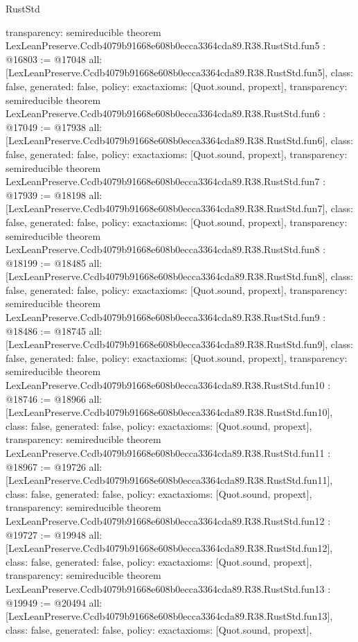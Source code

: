 \begin{lexlean}{RustStd}
\begin{coremodule}
{  transparency: semireducible
}
theorem LexLeanPreserve.Ccdb4079b91668e608b0ecca3364cda89.R38.RustStd.fun5 : @16803 := @17048 {
  all: [LexLeanPreserve.Ccdb4079b91668e608b0ecca3364cda89.R38.RustStd.fun5],
  class: false,
  generated: false,
  policy: exact{axioms: [Quot.sound, propext]},
  transparency: semireducible
}
theorem LexLeanPreserve.Ccdb4079b91668e608b0ecca3364cda89.R38.RustStd.fun6 : @17049 := @17938 {
  all: [LexLeanPreserve.Ccdb4079b91668e608b0ecca3364cda89.R38.RustStd.fun6],
  class: false,
  generated: false,
  policy: exact{axioms: [Quot.sound, propext]},
  transparency: semireducible
}
theorem LexLeanPreserve.Ccdb4079b91668e608b0ecca3364cda89.R38.RustStd.fun7 : @17939 := @18198 {
  all: [LexLeanPreserve.Ccdb4079b91668e608b0ecca3364cda89.R38.RustStd.fun7],
  class: false,
  generated: false,
  policy: exact{axioms: [Quot.sound, propext]},
  transparency: semireducible
}
theorem LexLeanPreserve.Ccdb4079b91668e608b0ecca3364cda89.R38.RustStd.fun8 : @18199 := @18485 {
  all: [LexLeanPreserve.Ccdb4079b91668e608b0ecca3364cda89.R38.RustStd.fun8],
  class: false,
  generated: false,
  policy: exact{axioms: [Quot.sound, propext]},
  transparency: semireducible
}
theorem LexLeanPreserve.Ccdb4079b91668e608b0ecca3364cda89.R38.RustStd.fun9 : @18486 := @18745 {
  all: [LexLeanPreserve.Ccdb4079b91668e608b0ecca3364cda89.R38.RustStd.fun9],
  class: false,
  generated: false,
  policy: exact{axioms: [Quot.sound, propext]},
  transparency: semireducible
}
theorem LexLeanPreserve.Ccdb4079b91668e608b0ecca3364cda89.R38.RustStd.fun10 : @18746 := @18966 {
  all: [LexLeanPreserve.Ccdb4079b91668e608b0ecca3364cda89.R38.RustStd.fun10],
  class: false,
  generated: false,
  policy: exact{axioms: [Quot.sound, propext]},
  transparency: semireducible
}
theorem LexLeanPreserve.Ccdb4079b91668e608b0ecca3364cda89.R38.RustStd.fun11 : @18967 := @19726 {
  all: [LexLeanPreserve.Ccdb4079b91668e608b0ecca3364cda89.R38.RustStd.fun11],
  class: false,
  generated: false,
  policy: exact{axioms: [Quot.sound, propext]},
  transparency: semireducible
}
theorem LexLeanPreserve.Ccdb4079b91668e608b0ecca3364cda89.R38.RustStd.fun12 : @19727 := @19948 {
  all: [LexLeanPreserve.Ccdb4079b91668e608b0ecca3364cda89.R38.RustStd.fun12],
  class: false,
  generated: false,
  policy: exact{axioms: [Quot.sound, propext]},
  transparency: semireducible
}
theorem LexLeanPreserve.Ccdb4079b91668e608b0ecca3364cda89.R38.RustStd.fun13 : @19949 := @20494 {
  all: [LexLeanPreserve.Ccdb4079b91668e608b0ecca3364cda89.R38.RustStd.fun13],
  class: false,
  generated: false,
  policy: exact{axioms: [Quot.sound, propext]},
}
\end{coremodule}
\end{lexlean}
